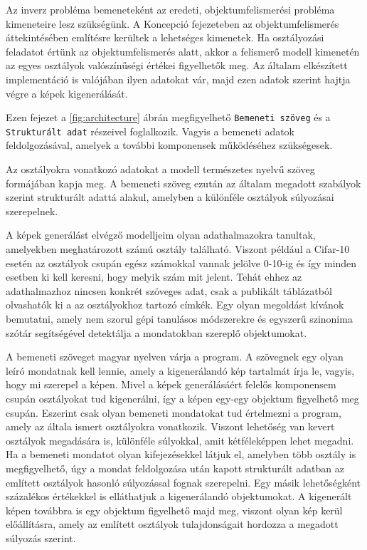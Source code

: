 
Az inverz probléma bemeneteként az eredeti, objektumfelismerési probléma kimeneteire lesz szükségünk. A Koncepció fejezeteben az objektumfelismerés áttekintésében említésre kerültek a lehetséges kimenetek. Ha osztályozási feladatot értünk az objektumfelismerés alatt, akkor a felismerő modell kimenetén az egyes osztályok valószínűségi értékei figyelhetők meg. Az általam elkészített implementáció is valójában ilyen adatokat vár, majd ezen adatok szerint hajtja végre a képek kigenerálását.

Ezen fejezet a \ref{fig:architecture} ábrán megfigyelhető \texttt{Bemeneti szöveg} és a \texttt{Strukturált adat} részeivel foglalkozik. Vagyis a bemeneti adatok feldolgozásával, amelyek a további komponensek működéséhez szükségesek.

Az osztályokra vonatkozó adatokat a modell természetes nyelvű szöveg formájában kapja meg. A bemeneti szöveg ezután az általam megadott szabályok szerint strukturált adattá alakul, amelyben a különféle osztályok súlyozásai szerepelnek.

A képek generálást elvégző modelljeim olyan adathalmazokra tanultak, amelyekben meghatározott számú osztály található. Viszont például a Cifar-10 esetén az osztályok csupán egész számokkal vannak jelölve 0-10-ig és így minden esetben ki kell keresni, hogy melyik szám mit jelent. Tehát ehhez az adathalmazhoz nincsen konkrét szöveges adat, csak a publikált táblázatból olvashatók ki a az osztályokhoz tartozó címkék. Egy olyan megoldást kívánok bemutatni, amely nem szorul gépi tanulásos módszerekre és egyszerű szinonima szótár segítségével detektálja a mondatokban szereplő objektumokat.


A bemeneti szöveget magyar nyelven várja a program. A szövegnek egy olyan leíró mondatnak kell lennie, amely a kigenerálandó kép tartalmát írja le, vagyis, hogy mi szerepel a képen. Mivel a képek generálásáért felelős komponensem csupán osztályokat tud kigenerálni, így a képen egy-egy objektum figyelhető meg csupán. Eszerint csak olyan bemeneti mondatokat tud értelmezni a program, amely az általa ismert osztályokra vonatkozik. Viszont lehetőség van kevert osztályok megadására is, különféle súlyokkal, amit kétféleképpen lehet megadni. Ha a bemeneti mondatot olyan kifejezésekkel látjuk el, amelyben több osztály is megfigyelhető, úgy a mondat feldolgozása után kapott strukturált adatban az említett osztályok hasonló súlyozással fognak szerepelni. Egy másik lehetőségként százalékos értékekkel is elláthatjuk a kigenerálandó objektumokat. A kigenerált képen továbbra is egy objektum figyelhető majd meg, viszont olyan kép kerül előállításra, amely az említett osztályok tulajdonságait hordozza a megadott súlyozás szerint.


